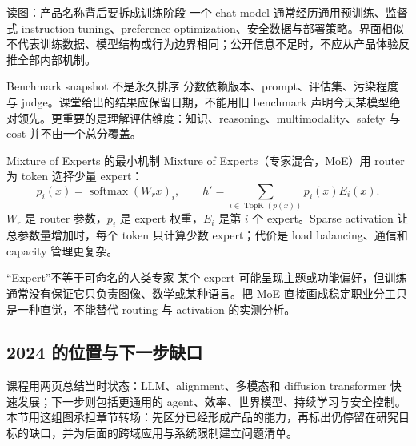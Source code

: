 \begin{knowledgebox}{读图：产品名称背后要拆成训练阶段}
一个 chat model 通常经历通用预训练、监督式 instruction tuning、preference optimization、安全数据与部署策略。界面相似不代表训练数据、模型结构或行为边界相同；公开信息不足时，不应从产品体验反推全部内部机制。
\end{knowledgebox}


\begin{warningbox}{Benchmark snapshot 不是永久排序}
分数依赖版本、prompt、评估集、污染程度与 judge。课堂给出的结果应保留日期，不能用旧 benchmark 声明今天某模型绝对领先。更重要的是理解评估维度：知识、reasoning、multimodality、safety 与 cost 并不由一个总分覆盖。
\end{warningbox}



\begin{importantbox}{Mixture of Experts 的最小机制}
Mixture of Experts（专家混合，MoE）用 router 为 token 选择少量 expert：
\[
p_i(x)=\operatorname{softmax}(W_rx)_i,\qquad
h'=\sum_{i\in\operatorname{TopK}(p(x))}p_i(x)E_i(x).
\]
$W_r$ 是 router 参数，$p_i$ 是 expert 权重，$E_i$ 是第 $i$ 个 expert。Sparse activation 让总参数量增加时，每个 token 只计算少数 expert；代价是 load balancing、通信和 capacity 管理更复杂。
\end{importantbox}

\begin{warningbox}{“Expert”不等于可命名的人类专家}
某个 expert 可能呈现主题或功能偏好，但训练通常没有保证它只负责图像、数学或某种语言。把 MoE 直接画成稳定职业分工只是一种直觉，不能替代 routing 与 activation 的实测分析。
\end{warningbox}

\subsection{2024 的位置与下一步缺口}

课程用两页总结当时状态：LLM、alignment、多模态和 diffusion transformer 快速发展；下一步则包括更通用的 agent、效率、世界模型、持续学习与安全控制。本节用这组图承担章节转场：先区分已经形成产品的能力，再标出仍停留在研究目标的缺口，并为后面的跨域应用与系统限制建立问题清单。

